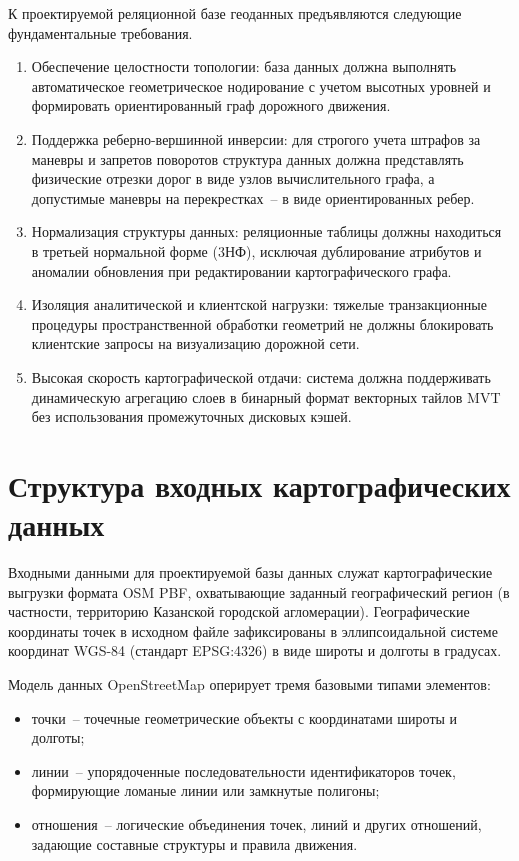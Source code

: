 К проектируемой реляционной базе геоданных предъявляются следующие фундаментальные требования.
\begin{enumerate}
    \item Обеспечение целостности топологии: база данных должна выполнять автоматическое геометрическое нодирование с учетом высотных уровней и формировать ориентированный граф дорожного движения.
    \item Поддержка реберно-вершинной инверсии: для строгого учета штрафов за маневры и запретов поворотов структура данных должна представлять физические отрезки дорог в виде узлов вычислительного графа, а допустимые маневры на перекрестках~-- в виде ориентированных ребер.
    \item Нормализация структуры данных: реляционные таблицы должны находиться в третьей нормальной форме (3НФ), исключая дублирование атрибутов и аномалии обновления при редактировании картографического графа.
    \item Изоляция аналитической и клиентской нагрузки: тяжелые транзакционные процедуры пространственной обработки геометрий не должны блокировать клиентские запросы на визуализацию дорожной сети.
    \item Высокая скорость картографической отдачи: система должна поддерживать динамическую агрегацию слоев в бинарный формат векторных тайлов MVT без использования промежуточных дисковых кэшей.
\end{enumerate}

\section{Структура входных картографических данных}
\label{sec:input_data}

Входными данными для проектируемой базы данных служат картографические выгрузки формата OSM PBF, охватывающие заданный географический регион (в частности, территорию Казанской городской агломерации). Географические координаты точек в исходном файле зафиксированы в эллипсоидальной системе координат WGS-84 (стандарт EPSG:4326) в виде широты и долготы в градусах.

Модель данных OpenStreetMap оперирует тремя базовыми типами элементов:
\begin{itemize}
    \item точки~-- точечные геометрические объекты с координатами широты и долготы;
    \item линии~-- упорядоченные последовательности идентификаторов точек, формирующие ломаные линии или замкнутые полигоны;
    \item отношения~-- логические объединения точек, линий и других отношений, задающие составные структуры и правила движения.
\end{itemize}

